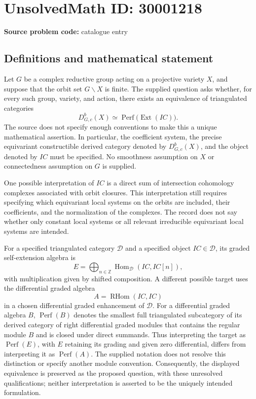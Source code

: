 \documentclass[11pt]{article}
\newcommand{\Z}{\mathbb{Z}}
\begin{document}
\section*{UnsolvedMath ID: 30001218}
\textbf{Source problem code:} catalogue entry
\subsection{Definitions and mathematical statement}
Let \(G\) be a complex reductive group acting on a projective variety \(X\), and suppose that the orbit set \(G\backslash X\) is finite. The supplied question asks whether, for every such group, variety, and action, there exists an equivalence of triangulated categories
\[
D^b_{G,c}(X)\simeq\operatorname{Perf}\bigl(\operatorname{Ext}(IC)\bigr).
\]
The source does not specify enough conventions to make this a unique mathematical assertion. In particular, the coefficient system, the precise equivariant constructible derived category denoted by \(D^b_{G,c}(X)\), and the object denoted by \(IC\) must be specified. No smoothness assumption on \(X\) or connectedness assumption on \(G\) is supplied.

One possible interpretation of \(IC\) is a direct sum of intersection cohomology complexes associated with orbit closures. This interpretation still requires specifying which equivariant local systems on the orbits are included, their coefficients, and the normalization of the complexes. The record does not say whether only constant local systems or all relevant irreducible equivariant local systems are intended.

For a specified triangulated category \(\mathcal D\) and a specified object \(IC\in\mathcal D\), its graded self-extension algebra is
\[
E=\bigoplus_{n\in\Z}\operatorname{Hom}_{\mathcal D}(IC,IC[n]),
\]
with multiplication given by shifted composition. A different possible target uses the differential graded algebra
\[
A=\operatorname{RHom}(IC,IC)
\]
in a chosen differential graded enhancement of \(\mathcal D\). For a differential graded algebra \(B\), \(\operatorname{Perf}(B)\) denotes the smallest full triangulated subcategory of its derived category of right differential graded modules that contains the regular module \(B\) and is closed under direct summands. Thus interpreting the target as \(\operatorname{Perf}(E)\), with \(E\) retaining its grading and given zero differential, differs from interpreting it as \(\operatorname{Perf}(A)\). The supplied notation does not resolve this distinction or specify another module convention. Consequently, the displayed equivalence is preserved as the proposed question, with these unresolved qualifications; neither interpretation is asserted to be the uniquely intended formulation.
\end{document}
